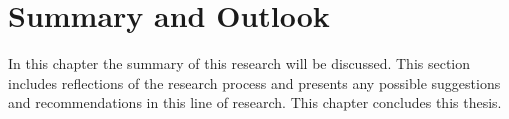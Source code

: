 \chapter{Summary and Outlook} \label{chp:outlook}

In this chapter the summary of this research will be discussed. 
This section includes reflections of the research process and presents any possible suggestions and recommendations in this line of research. 
This chapter concludes this thesis.
